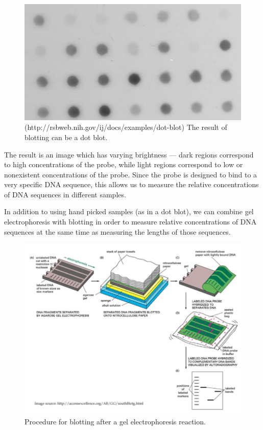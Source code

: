 \documentclass{article}
\begin{document}
\begin{figure}[h!]
    \centering
    \includegraphics[scale=0.3]{images/blotting.png}
    \caption{
        (http://rsbweb.nih.gov/ij/docs/examples/dot-blot) The result of blotting can be a dot blot.
    }
\end{figure}

The result is an image which has varying brightness --- dark regions correspond to high concentrations
of the probe, while light regions correspond to low or nonexistent concentrations of the probe.
Since the probe is designed to bind to a very specific DNA sequence, this allows us to measure the
relative concentrations of DNA sequences in different samples.

In addition to using hand picked samples (as in a dot blot), we can combine gel electrophoresis with
blotting in order to measure relative concentrations of DNA sequences at the same time as measuring
the lengths of those sequences. 

\begin{figure}[h!]
    \centering
    \includegraphics[scale=0.5]{images/gel-blotting-procedure.png}
    \caption{
        Procedure for blotting after a gel electrophoresis reaction.
    }
\end{figure}
\end{document}
